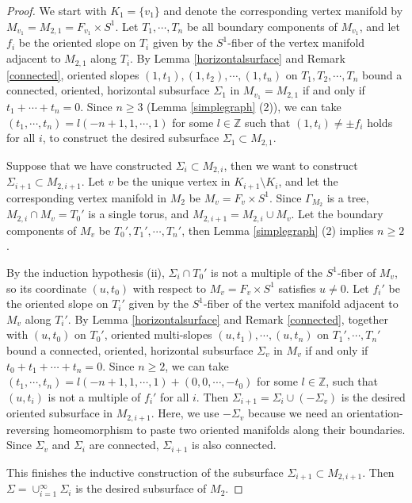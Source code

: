 \documentclass{amsart}
\numberwithin{equation}{section}
\theoremstyle{definition}
\begin{document}
\begin{proof}
We start with $K_1=\{v_1\}$ and denote the corresponding vertex manifold by $M_{v_1}=M_{2,1}=F_{v_1}\times S^1$. Let $T_1, \cdots,T_n$ be all boundary components of $M_{v_1}$, and let $f_i$ be the oriented slope on $T_i$ given by the $S^1$-fiber of the vertex manifold adjacent to $M_{2,1}$ along $T_i$. By Lemma \ref{horizontalsurface} and Remark \ref{connected}, oriented slopes $(1,t_1),(1,t_2),\cdots,(1,t_n)$ on $T_1, T_2,\cdots,T_n$ bound a connected, oriented, horizontal subsurface $\Sigma_1$ in $M_{v_1}=M_{2,1}$ if and only if $t_1+\cdots+ t_n=0$. Since $n\geq 3$ (Lemma \ref{simplegraph} (2)), we can take $(t_1,\cdots,t_n)=l(-n+1, 1,\cdots, 1)$ for some $l\in \mathbb{Z}$ such that $(1,t_i)\ne \pm f_i$ holds for all $i$, to construct the desired subsurface $\Sigma_1\subset M_{2,1}$.

Suppose that we have constructed $\Sigma_i\subset M_{2,i}$, then we want to construct $\Sigma_{i+1}\subset M_{2,i+1}$. Let $v$ be the unique vertex in $K_{i+1}\setminus K_i$, and let the corresponding vertex manifold in $M_2$ be $M_v=F_v\times S^1$. Since $\Gamma_{M_2}$ is a tree, $M_{2,i}\cap M_v=T_0'$ is a single torus, and $M_{2,i+1}=M_{2,i}\cup M_v$. Let the boundary components of $M_v$ be $T_0', T_1',\cdots,T_n'$, then Lemma \ref{simplegraph} (2) implies $n\geq 2$.

By the induction hypothesis (ii), $\Sigma_i\cap T_0'$ is not a multiple of the $S^1$-fiber of $M_v$, so its
coordinate $(u,t_0)$ with respect to $M_v=F_v\times S^1$ satisfies $u\ne 0$. Let $f_i'$ be the oriented slope on $T_i'$ given by the $S^1$-fiber of the vertex manifold adjacent to $M_v$ along $T_i'$. By Lemma \ref{horizontalsurface} and Remark \ref{connected}, together with $(u,t_0)$ on $T_0'$, oriented multi-slopes $(u,t_1),\cdots,(u,t_n)$ on $T_1',\cdots,T_n'$ bound a connected, oriented, horizontal subsurface $\Sigma_v$ in $M_v$ if and only if $t_0+t_1+\cdots+ t_n=0$. Since $n\geq 2$, we can take $(t_1,\cdots,t_n)=l(-n+1,1,\cdots,1)+(0,0,\cdots,-t_0)$ for some $l\in \mathbb{Z}$, such that $(u,t_i)$ is not a multiple of $f_i'$ for all $i$. Then $\Sigma_{i+1}=\Sigma_i\cup (-\Sigma_v)$ is the desired oriented subsurface in $M_{2,i+1}$. Here, we use $-\Sigma_v$ because we need an orientation-reversing homeomorphism to paste two oriented manifolds along their boundaries. Since $\Sigma_v$ and $\Sigma_i$ are connected, $\Sigma_{i+1}$ is also connected.

This finishes the inductive construction of the subsurface $\Sigma_{i+1}\subset M_{2,i+1}$. Then $\Sigma=\cup_{i=1}^{\infty}\Sigma_i$ is the desired subsurface of $M_2$.


\end{proof}
\end{document}
